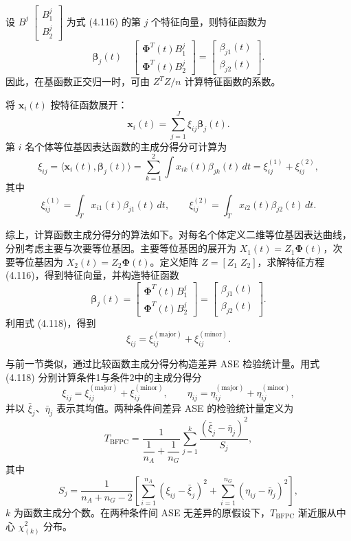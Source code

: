 设 $B^j\;\begin{bmatrix}B_1^j\\B_2^j\end{bmatrix}$ 为式 (4.116) 的第 $j$ 个特征向量，则特征函数为
\begin{equation}
\boldsymbol\beta_j(t)\quad
\begin{bmatrix}\boldsymbol\Phi^T(t)B_1^j\\\boldsymbol\Phi^T(t)B_2^j\end{bmatrix}
=\begin{bmatrix}\beta_{j1}(t)\\\beta_{j2}(t)\end{bmatrix}.
\tag{4.117}
\end{equation}
因此，在基函数正交归一时，可由 $Z^TZ/n$ 计算特征函数的系数。

将 $\mathbf x_i(t)$ 按特征函数展开：
\[
\mathbf x_i(t)=\sum_{j=1}^{J}\xi_{ij}\boldsymbol\beta_j(t).
\]
第 $i$ 名个体等位基因表达函数的主成分得分可计算为
\begin{equation}
\xi_{ij}=\langle\mathbf x_i(t),\boldsymbol\beta_j(t)\rangle
=\sum_{k=1}^{2}\int x_{ik}(t)\beta_{jk}(t)\,dt
=\xi_{ij}^{(1)}+\xi_{ij}^{(2)},
\tag{4.118}
\end{equation}
其中
\[
\xi_{ij}^{(1)}=\int_T x_{i1}(t)\beta_{j1}(t)\,dt,\qquad
\xi_{ij}^{(2)}=\int_T x_{i2}(t)\beta_{j2}(t)\,dt.
\]

综上，计算函数主成分得分的算法如下。对每名个体定义二维等位基因表达曲线，分别考虑主要与次要等位基因。主要等位基因的展开为 $X_1(t)=Z_1\boldsymbol\Phi(t)$，次要等位基因为 $X_2(t)=Z_2\boldsymbol\Phi(t)$。定义矩阵 $Z=[Z_1\;Z_2]$，求解特征方程 (4.116)，得到特征向量，并构造特征函数
\[
\boldsymbol\beta_j(t)=\begin{bmatrix}\boldsymbol\Phi^T(t)B_1^j\\\boldsymbol\Phi^T(t)B_2^j\end{bmatrix}
=\begin{bmatrix}\beta_{j1}(t)\\\beta_{j2}(t)\end{bmatrix}.
\]
利用式 (4.118)，得到
\[
\xi_{ij}=\xi_{ij}^{(\mathrm{major})}+\xi_{ij}^{(\mathrm{minor})}.
\]

与前一节类似，通过比较函数主成分得分构造差异 ASE 检验统计量。用式 (4.118) 分别计算条件1与条件2中的主成分得分
\[
\xi_{ij}=\xi_{ij}^{(\mathrm{major})}+\xi_{ij}^{(\mathrm{minor})},\qquad
\eta_{ij}=\eta_{ij}^{(\mathrm{major})}+\eta_{ij}^{(\mathrm{minor})},
\]
并以 $\bar\xi_j$、$\bar\eta_j$ 表示其均值。两种条件间差异 ASE 的检验统计量定义为
\[
T_{\mathrm{BFPC}}=\frac1{\dfrac1{n_A}+\dfrac1{n_G}}
\sum_{j=1}^{k}\frac{(\bar\xi_j-\bar\eta_j)^2}{S_j},
\]
其中
\[
S_j=\frac1{n_A+n_G-2}\left[\sum_{i=1}^{n_A}(\xi_{ij}-\bar\xi_j)^2
+\sum_{i=1}^{n_G}(\eta_{ij}-\bar\eta_j)^2\right],
\]
$k$ 为函数主成分个数。在两种条件间 ASE 无差异的原假设下，$T_{\mathrm{BFPC}}$ 渐近服从中心 $\chi^2_{(k)}$ 分布。

